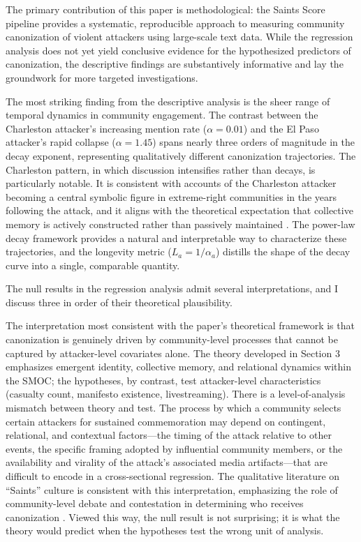 \documentclass[12pt]{article}
\begin{document}
The primary contribution of this paper is methodological: the Saints Score pipeline provides a systematic, reproducible approach to measuring community canonization of violent attackers using large-scale text data. While the regression analysis does not yet yield conclusive evidence for the hypothesized predictors of canonization, the descriptive findings are substantively informative and lay the groundwork for more targeted investigations.

The most striking finding from the descriptive analysis is the sheer range of temporal dynamics in community engagement. The contrast between the Charleston attacker's increasing mention rate ($\alpha = 0.01$) and the El Paso attacker's rapid collapse ($\alpha = 1.45$) spans nearly three orders of magnitude in the decay exponent, representing qualitatively different canonization trajectories. The Charleston pattern, in which discussion intensifies rather than decays, is particularly notable. It is consistent with accounts of the Charleston attacker becoming a central symbolic figure in extreme-right communities in the years following the attack, and it aligns with the theoretical expectation that collective memory is actively constructed rather than passively maintained \parencite{gongaware2010collective, macklin2022praise}. The power-law decay framework provides a natural and interpretable way to characterize these trajectories, and the longevity metric ($L_a = 1/\alpha_a$) distills the shape of the decay curve into a single, comparable quantity.

The null results in the regression analysis admit several interpretations, and I discuss three in order of their theoretical plausibility.

The interpretation most consistent with the paper's theoretical framework is that canonization is genuinely driven by community-level processes that cannot be captured by attacker-level covariates alone. The theory developed in Section 3 emphasizes emergent identity, collective memory, and relational dynamics within the SMOC; the hypotheses, by contrast, test attacker-level characteristics (casualty count, manifesto existence, livestreaming). There is a level-of-analysis mismatch between theory and test. The process by which a community selects certain attackers for sustained commemoration may depend on contingent, relational, and contextual factors---the timing of the attack relative to other events, the specific framing adopted by influential community members, or the availability and virality of the attack's associated media artifacts---that are difficult to encode in a cross-sectional regression. The qualitative literature on ``Saints'' culture is consistent with this interpretation, emphasizing the role of community-level debate and contestation in determining who receives canonization \parencite{phillips2024he}. Viewed this way, the null result is not surprising; it is what the theory would predict when the hypotheses test the wrong unit of analysis.
\end{document}

